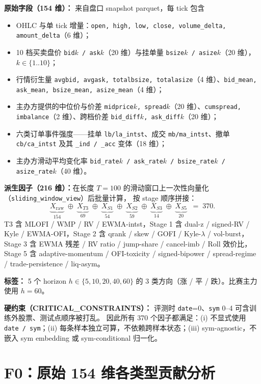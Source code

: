 \documentclass[10.5pt,a4paper]{article}
\begin{document}
\textbf{原始字段（154 维）：} 来自盘口 snapshot parquet，每 tick 包含
\begin{itemize}[leftmargin=2.2em,itemsep=2pt,topsep=2pt]
  \item OHLC 与单 tick 增量：\texttt{open, high, low, close, volume\_delta, amount\_delta}（6 维）；
  \item 10 档买卖盘价 \texttt{bid$k$ / ask$k$}（20 维）与挂单量 \texttt{bsize$k$ / asize$k$}（20 维），$k\in\{1..10\}$；
  \item 行情衍生量 \texttt{avgbid, avgask, totalbsize, totalasize}（4 维）、\texttt{bid\_mean, ask\_mean, bsize\_mean, asize\_mean}（4 维）；
  \item 主办方提供的中位价与价差 \texttt{midprice$k$, spread$k$}（20 维）、\texttt{cumspread, imbalance}（2 维）、跨档价差 \texttt{bid\_diff$k$, ask\_diff$k$}（20 维）；
  \item 六类订单事件强度——挂单 \texttt{lb/la\_intst}、成交 \texttt{mb/ma\_intst}、撤单 \texttt{cb/ca\_intst} 及其 \texttt{\_ind / \_acc} 变体（18 维）；
  \item 主办方滑动平均变化率 \texttt{bid\_rate$k$ / ask\_rate$k$ / bsize\_rate$k$ / asize\_rate$k$}（40 维）。
\end{itemize}

\textbf{派生因子（216 维）：}在长度 $T=100$ 的滑动窗口上一次性向量化（\texttt{sliding\_window\_view}）后批量计算，
按 stage 顺序拼接：
\[
\underbrace{X_{\text{raw}}}_{154}
\;\oplus\;
\underbrace{X_{T3}}_{69}
\;\oplus\;
\underbrace{X_{S1}}_{54}
\;\oplus\;
\underbrace{X_{S2}}_{59}
\;\oplus\;
\underbrace{X_{S3}}_{14}
\;\oplus\;
\underbrace{X_{S5}}_{20}
\;\;=\; 370 .
\]
T3 含 MLOFI / WMP / RV / EWMA-intst，Stage 1 含 dual-z / signed-RV / Kyle / EWMA-OFI，Stage 2 含 qrank / skew / GOFI / Kyle-$\lambda$ / vol-burst，Stage 3 含 EWMA 残差 / RV ratio / jump-share / cancel-imb / Roll 效价比，Stage 5 含 adaptive-momentum / OFI-toxicity / signed-bipower / spread-regime / trade-persistence / liq-asym。

\textbf{标签：} 5 个 horizon $h\in\{5,10,20,40,60\}$ 的 3 类方向（涨 / 平 / 跌）。比赛主力使用 $h=60$。

\textbf{硬约束（CRITICAL\_CONSTRAINTS）：} 评测时 \texttt{date}=0、\texttt{sym} 0–4 可含训练外股票、测试点顺序被打乱。
因此所有 370 个因子都满足：(i) 不显式使用 \texttt{date / sym}；(ii) 每条样本独立可算，不依赖跨样本状态；(iii) sym-agnostic，不嵌入 sym embedding 或 sym-conditional 归一化。

\section{F0：原始 154 维各类型贡献分析}
\end{document}
